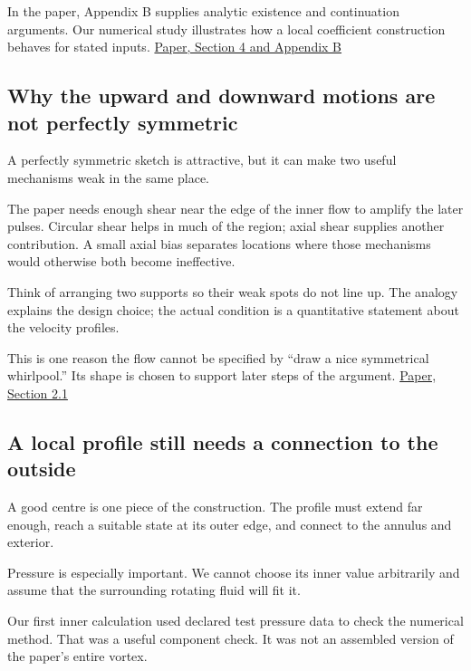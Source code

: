 \documentclass[
  english,
  11pt,
]{article}
\begin{document}
In the paper, Appendix B supplies analytic existence and continuation
arguments. Our numerical study illustrates how a local coefficient
construction behaves for stated inputs.
\href{https://cdn.openai.com/pdf/32d9f210-8b73-45e0-91bc-82a30aef8a9a/navier-stokes.pdf}{Paper,
Section 4 and Appendix B}

\subsection{Why the upward and downward motions are not perfectly
symmetric}\label{why-the-upward-and-downward-motions-are-not-perfectly-symmetric}

A perfectly symmetric sketch is attractive, but it can make two useful
mechanisms weak in the same place.

The paper needs enough shear near the edge of the inner flow to amplify
the later pulses. Circular shear helps in much of the region; axial
shear supplies another contribution. A small axial bias separates
locations where those mechanisms would otherwise both become
ineffective.

Think of arranging two supports so their weak spots do not line up. The
analogy explains the design choice; the actual condition is a
quantitative statement about the velocity profiles.

This is one reason the flow cannot be specified by ``draw a nice
symmetrical whirlpool.'' Its shape is chosen to support later steps of
the argument.
\href{https://cdn.openai.com/pdf/32d9f210-8b73-45e0-91bc-82a30aef8a9a/navier-stokes.pdf\#page=5}{Paper,
Section 2.1}

\subsection{A local profile still needs a connection to the
outside}\label{a-local-profile-still-needs-a-connection-to-the-outside}

A good centre is one piece of the construction. The profile must extend
far enough, reach a suitable state at its outer edge, and connect to the
annulus and exterior.

Pressure is especially important. We cannot choose its inner value
arbitrarily and assume that the surrounding rotating fluid will fit it.

Our first inner calculation used declared test pressure data to check
the numerical method. That was a useful component check. It was not an
assembled version of the paper's entire vortex.
\end{document}
